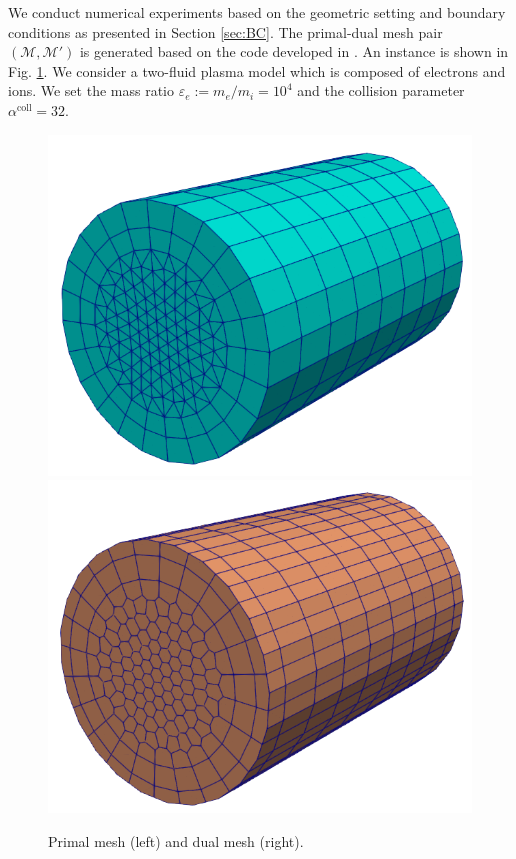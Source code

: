 \documentclass{article}
\begin{document}
We conduct numerical experiments based on the geometric setting and boundary conditions as presented in Section \ref{sec:BC}. The primal-dual mesh pair $(\mathcal{M}, \mathcal{M}')$ is generated based on the code developed in \cite[][ch. 1]{fuchs_2021}. An instance is shown in Fig. \ref{fig:primal_dual_meshes}. We consider a two-fluid plasma model which is composed of electrons and ions. We set the mass ratio $\varepsilon_e := m_e / m_i = 10^4$ and the collision parameter $\alpha^\text{coll} = 32$.
\begin{figure}
    \centering
    \includegraphics[scale=0.3]{primal_mesh.png}
    \hspace{1cm}
    \includegraphics[scale=0.3]{dual_mesh.png}
    \caption{Primal mesh (left) and dual mesh (right).}
    \label{fig:primal_dual_meshes}
\end{figure}
\end{document}
